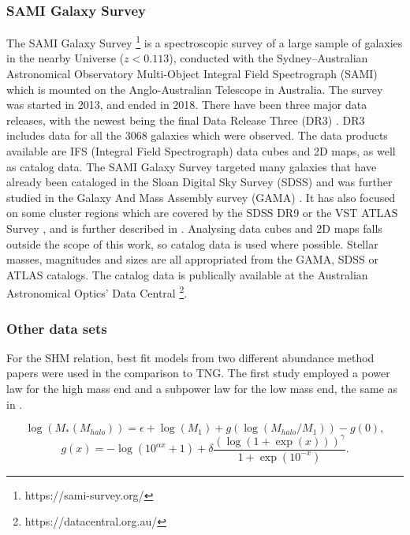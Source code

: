 \subsubsection{SAMI Galaxy Survey}
The SAMI Galaxy Survey \footnote{https://sami-survey.org/} is a spectroscopic survey of a large sample of galaxies in the nearby Universe ($z < 0.113$), conducted with the Sydney–Australian Astronomical Observatory Multi-Object Integral Field Spectrograph (SAMI) which is mounted on the Anglo-Australian Telescope in Australia. The survey was started in 2013, and ended in 2018. There have been three major data releases, with the newest being the final Data Release Three (DR3) \parencite{Scott2021}. DR3 includes data for all the 3068 galaxies which were observed. The data products available are IFS (Integral Field Spectrograph) data cubes and 2D maps, as well as catalog data. The SAMI Galaxy Survey targeted many galaxies that have already been cataloged in the Sloan Digital Sky Survey (SDSS) \parencite{York2000} and was further studied in the Galaxy And Mass Assembly survey (GAMA) \parencite{Driver2011}. It has also focused on some cluster regions which are covered by the SDSS DR9 or the VST ATLAS Survey \parencite{Shanks2013}, and is further described in \textcite{Owers2017}. Analysing data cubes and 2D maps falls outside the scope of this work, so catalog data is used where possible. Stellar masses, magnitudes and sizes are all appropriated from the GAMA, SDSS or ATLAS catalogs. The catalog data is publically available at the Australian Astronomical Optics’ Data Central \footnote{https://datacentral.org.au/}.

\subsubsection{Other data sets}
For the SHM relation, best fit models from two different abundance method papers were used in the comparison to TNG.
The first study \textcite{Zanisi2019} employed a power law for the high mass end and a subpower law for the low mass end, the same as in \textcite{Behroozi2013}.

\begin{equation} \label{eq_zainsi}
    \log(M_*(M_{halo})) = \epsilon +  \log(M_1) + g(\log(M_{halo}/M_1)) -g(0),
\end{equation}
\begin{equation*}
    g(x) = -\log(10^{\alpha x}+1)+\delta \frac{(\log(1+\exp(x)))^\gamma}{1 +\exp(10^{-x})}.
\end{equation*}


